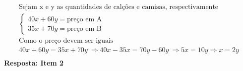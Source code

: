 \begin{eqnarray*}
		\text{Sejam x e y as quantidades de calções e camisas, respectivamente}\\
		\begin{cases}
				40x+60y=\text{preço em A}\\
				35x+70y=\text{preço em B}
		\end{cases}\\
		\text{Como o preço devem ser iguais}\\
40x+60y=35x+70y\ 
		\Rightarrow
40x-35x=70y-60y \ 
		\Rightarrow
		5x=10y \Rightarrow x = 2y\\
\end{eqnarray*}
{\bfseries Resposta: Item 2}
